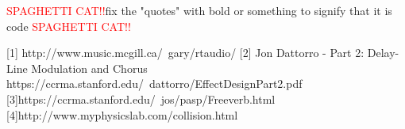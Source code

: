 \documentclass[pdftext,twoside,10pt]{article}
\newcommand{\spag}{\textcolor{red}{SPAGHETTI CAT!!}}
\begin{document}
\spag fix the "quotes" with bold or something to signify that it is code \spag

[1] http://www.music.mcgill.ca/~gary/rtaudio/
[2] Jon Dattorro - Part 2: Delay-Line Modulation and Chorus  
https://ccrma.stanford.edu/~dattorro/EffectDesignPart2.pdf 
[3]https://ccrma.stanford.edu/~jos/pasp/Freeverb.html 
[4]http://www.myphysicslab.com/collision.html
\end{document}
